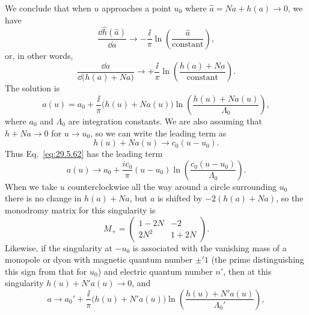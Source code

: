 We conclude that when \(u\) approaches a point \(u_0\) where
\(\widehat a=Na+h(a)\longrightarrow0\), we have
\begin{equation}
  \frac{\dd\widehat h(\widehat a)}{\dd\widehat a}
  \longrightarrow-\frac{\ii}{\pi}
  \ln\left(\frac{\widehat a}{\text{constant}}\right),
  \tag{29.5.60}\label{eq:29.5.60}
\end{equation}
or, in other words,
\begin{equation}
  \frac{\dd a}{\dd\bigl(h(a)+Na\bigr)}
  \longrightarrow+\frac{\ii}{\pi}
  \ln\left(\frac{h(a)+Na}{\text{constant}}\right).
  \tag{29.5.61}\label{eq:29.5.61}
\end{equation}
The solution is
\begin{equation}
  a(u)=a_0+\frac{\ii}{\pi}\bigl(h(u)+Na(u)\bigr)
  \ln\left(\frac{h(u)+Na(u)}{\Lambda_0}\right),
  \tag{29.5.62}\label{eq:29.5.62}
\end{equation}
where \(a_0\) and \(\Lambda_0\) are integration constants. We are also
assuming that \(h+Na\longrightarrow0\) for \(u\longrightarrow u_0\), so we
can write the leading term as
\begin{equation}
  h(u)+Na(u)\longrightarrow c_0(u-u_0).
  \tag{29.5.63}\label{eq:29.5.63}
\end{equation}
Thus Eq.~\eqref{eq:29.5.62} has the leading term
\begin{equation}
  a(u)\longrightarrow a_0+\frac{ic_0}{\pi}(u-u_0)
  \ln\left(\frac{c_0(u-u_0)}{\Lambda_0}\right).
  \tag{29.5.64}\label{eq:29.5.64}
\end{equation}
When we take \(u\) counterclockwise all the way around a circle surrounding
\(u_0\) there is no change in \(h(a)+Na\), but \(a\) is shifted by
\(-2(h(a)+Na)\), so the monodromy matrix for this singularity is
\begin{equation}
  M_+=
  \begin{pmatrix}
    1-2N&-2\\
    2N^2&1+2N
  \end{pmatrix}.
  \tag{29.5.65}\label{eq:29.5.65}
\end{equation}
Likewise, if the singularity at \(-u_0\) is associated with the vanishing
mass of a monopole or dyon with magnetic quantum number \(\mathord{\pm}'1\)
(the prime distinguishing this sign from that for \(u_0\)) and electric
quantum number \(n'\), then at this singularity
\(h(u)+N'a(u)\longrightarrow0\), and
\begin{equation}
  a\longrightarrow a_0'
  +\frac{\ii}{\pi}\bigl(h(u)+N'a(u)\bigr)
  \ln\left(\frac{h(u)+N'a(u)}{\Lambda_0'}\right),
  \tag{29.5.66}\label{eq:29.5.66}
\end{equation}

